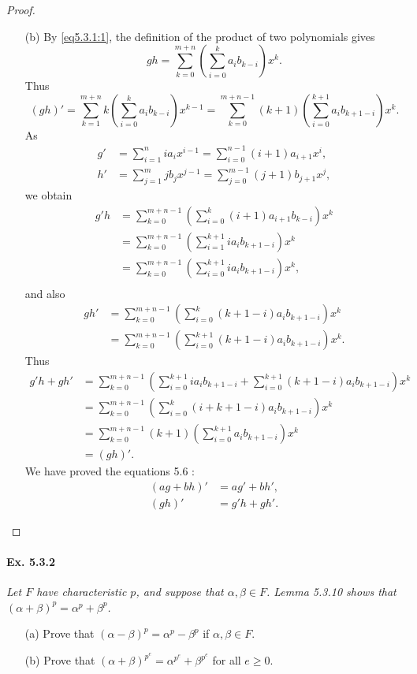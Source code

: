 \documentclass[11pt,a4paper]{article}
\begin{document}
\begin{proof}
\begin{enumerate}
\item[(b)]
By \eqref{eq5.3.1:1}, the definition of the product of two polynomials gives
$$gh = \sum_{k=0}^{m+n} \left(\sum_{i=0}^k a_i b_{k-i} \right)x^k .$$
Thus 
$$(gh)'= \sum_{k=1}^{m+n} k\left(\sum_{i=0}^k a_i b_{k-i} \right)x^{k-1}=\sum_{k=0}^{m+n-1} (k+1)\left(\sum_{i=0}^{k+1} a_i b_{k+1-i} \right)x^{k}.$$
As
\begin{align*}
g' &= \sum_{i=1}^n ia_i x^{i-1} =\sum_{i=0}^{n-1} (i+1)a_{i+1} x^{i},\\
h' &= \sum_{j=1}^m jb_jx^{j-1} =\sum_{j=0}^{m-1} (j+1)b_{j+1} x^{j},
\end{align*}
we obtain
\begin{align*}
g'h&= \sum_{k=0}^{m+n-1}\left( \sum_{i=0}^k (i+1)a_{i+1} b_{k-i}\right)x^k\\
&= \sum_{k=0}^{m+n-1} \left(\sum_{i=1}^{k+1} i a_{i} b_{k+1-i}\right)x^k\\
&= \sum_{k=0}^{m+n-1} \left(\sum_{i=0}^{k+1} i a_{i} b_{k+1-i}\right)x^k,\\
\end{align*}
and also
\begin{align*}
gh'&=\sum_{k=0}^{m+n-1}\left( \sum_{i=0}^k (k+1-i)a_{i} b_{k+1-i}\right)x^k\\
&=\sum_{k=0}^{m+n-1}\left( \sum_{i=0}^{k+1} (k+1-i)a_{i} b_{k+1-i}\right)x^k.
\end{align*}
Thus
\begin{align*}
g'h+gh' &= \sum_{k=0}^{m+n-1} \left(\sum_{i=0}^{k+1} i a_{i} b_{k+1-i}+ \sum_{i=0}^{k+1} (k+1-i)a_{i} b_{k+1-i} \right)x^k\\
&=\sum_{k=0}^{m+n-1}\left( \sum_{i=0}^k (i+k+1-i)a_{i} b_{k+1-i}\right)x^k\\
&=\sum_{k=0}^{m+n-1} (k+1)\left(\sum_{i=0}^{k+1} a_i b_{k+1-i} \right)x^{k}\\
&=(gh)'.
\end{align*}
We have proved the equations 5.6 : 
\begin{align*}
(ag+bh)' &= ag'+bh',\\
(gh)'&= g'h+gh'.
\end{align*}
\end{enumerate}
\end{proof}

\paragraph{Ex. 5.3.2}

{\it Let $F$ have characteristic $p$, and suppose that $\alpha,\beta \in F$. Lemma 5.3.10 shows that $(\alpha + \beta)^p = \alpha^p+\beta^p$.
\begin{enumerate}
\item[(a)] Prove that $(\alpha -\beta)^p = \alpha^p - \beta^p$ if $\alpha, \beta \in F$.
\item[(b)] Prove that $(\alpha + \beta)^{p^e} = \alpha^{p^e} + \beta^{p^e}$ for all $e\geq 0$.
\end{enumerate}
}
\end{document}
